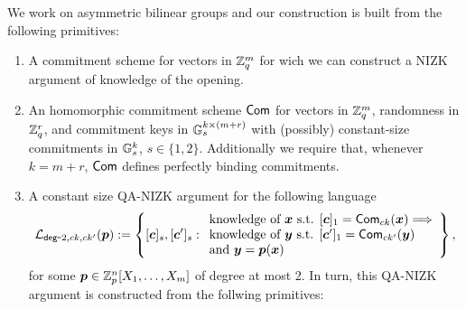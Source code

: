 We work on asymmetric bilinear groups and our construction is built from the following primitives:
\begin{enumerate}
\item A commitment scheme for vectors in $\mathbb{Z}_q^m$ for wich we can construct a NIZK argument of knowledge of the opening.
\item An homomorphic commitment scheme $\mathsf{Com}$ for vectors in $\mathbb{Z}_q^m$, randomness in $\mathbb{Z}_q^r$, and commitment keys in $\mathbb{G}_s^{k\times(m+r)}$ with (possibly) constant-size commitments in $\mathbb{G}_s^k$, $s\in\{1,2\}$. Additionally we require that, whenever $k=m+r$, $\mathsf{Com}$ defines perfectly binding commitments.
\item A constant size QA-NIZK argument for the following language
$$
\mathcal{L}_{\mathsf{deg}\mbox{-}2,ck,ck'}({\boldsymbol{p}}):=\left\{[{\boldsymbol{c}}]_s,[{\boldsymbol{c}}']_s:
\begin{array}{l}
		\text{knowledge of } {\boldsymbol{x}} \text{ s.t. }
		{[{\boldsymbol{c}}]_1=\mathsf{Com}_{ck}({\boldsymbol{x}})}
		\Longrightarrow\\
		\text{knowledge of }{\boldsymbol{y}}\text{ s.t. }{[{\boldsymbol{c}}']_1=\mathsf{Com}_{ck'}({\boldsymbol{y}})}\\
		\text{and } {\boldsymbol{y}}={\boldsymbol{p}}({\boldsymbol{x}})
	\end{array}\right\},
$$
for some ${\boldsymbol{p}}\in\mathbb{Z}_p^n[X_1,\ldots,X_m]$ of degree at most 2. In turn, this QA-NIZK argument is constructed from the follwing primitives:


\end{enumerate}
